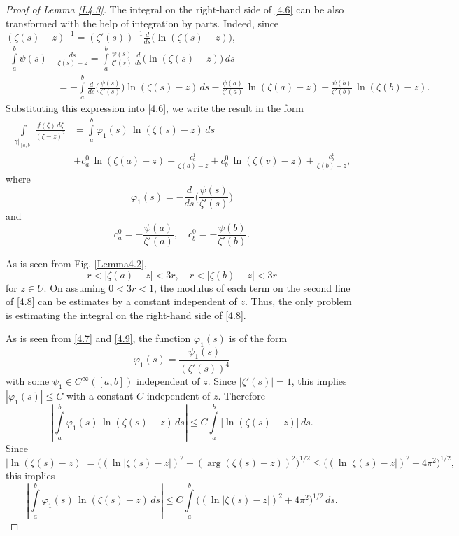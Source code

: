 \documentclass[12pt,reqno]{amsart}
\begin{document}
\begin{proof}[Proof of Lemma \ref{L4.3}]
The integral on the right-hand side of \eqref{4.6} can be also transformed with the help of integration by parts. Indeed, since
$(\zeta(s)-z)^{-1}=(\zeta'(s))^{-1}\frac{d}{ds}\big(\ln(\zeta(s)-z)\big)$,
$$
\begin{aligned}
\int\limits_a^b \psi(s)\,&\frac{ds}{\zeta(s)-z}
=\int\limits_a^b \frac{\psi(s)}{\zeta'(s)}\,\frac{d}{ds}\big(\ln(\zeta(s)-z)\big)\,ds\\
&=-\int\limits_a^b\frac{d}{ds}\Big(\frac{\psi(s)}{\zeta'(s)}\Big)\ln(\zeta(s)-z)\,ds
-\frac{\psi(a)}{\zeta'(a)}\,\ln(\zeta(a)-z)+\frac{\psi(b)}{\zeta'(b)}\,\ln(\zeta(b)-z).
\end{aligned}
$$
Substituting this expression into \eqref{4.6}, we write the result in the form
\begin{equation}
\begin{aligned}
\int\limits_{\gamma|_{[a,b]}}\frac{f(\zeta)\,d\zeta}{(\zeta-z)^2}
&=\int\limits_a^b \varphi_1(s)\,\ln(\zeta(s)-z)\,ds\\
&+c_a^0\,\ln(\zeta(a)-z)+\frac{c_a^1}{\zeta(a)-z}+c_b^0\,\ln(\zeta(v)-z)+\frac{c_b^1}{\zeta(b)-z},
\end{aligned}
                                \label{4.8}
\end{equation}
where
\begin{equation}
\varphi_1(s)=-\frac{d}{ds}\Big(\frac{\psi(s)}{\zeta'(s)}\Big)
                                \label{4.9}
\end{equation}
and
$$
c_a^0=-\frac{\psi(a)}{\zeta'(a)},\quad c_b^0=-\frac{\psi(b)}{\zeta'(b)}.
$$

As is seen from Fig. \ref{Lemma4.2},
\begin{equation}
r<|\zeta(a)-z|<3r,\quad r<|\zeta(b)-z|<3r
                                \label{4.10}
\end{equation}
for $z\in U$. On assuming $0<3r<1$, the modulus of each term on the second line of \eqref{4.8} can be estimates by a constant independent of $z$. Thus, the only problem is estimating the integral on the right-hand side of \eqref{4.8}.

As is seen from \eqref{4.7} and \eqref{4.9}, the function $\varphi_1(s)$ is of the form
$$
\varphi_1(s)=\frac{\psi_1(s)}{(\zeta'(s))^4}
$$
with some $\psi_1\in C^\infty([a,b])$ independent of $z$. Since $|\zeta'(s)|=1$, this implies $|\varphi_1(s)|\le C$ with a constant $C$ independent of $z$. Therefore
$$
\left|\int\limits_a^b \varphi_1(s)\,\ln(\zeta(s)-z)\,ds\right|\le
C\int\limits_a^b |\ln(\zeta(s)-z)|\,ds.
$$
Since
$$
|\ln(\zeta(s)-z)|=\Big((\ln|\zeta(s)-z|)^2+(\arg(\zeta(s)-z))^2\Big)^{1/2}\le
\Big((\ln|\zeta(s)-z|)^2+4\pi^2\Big)^{1/2},
$$
this implies
\begin{equation}
\left|\int\limits_a^b \varphi_1(s)\,\ln(\zeta(s)-z)\,ds\right|\le
C\int\limits_a^b \Big((\ln|\zeta(s)-z|)^2+4\pi^2\Big)^{1/2}\,ds.
                                \label{4.11}
\end{equation}


\end{proof}
\end{document}
